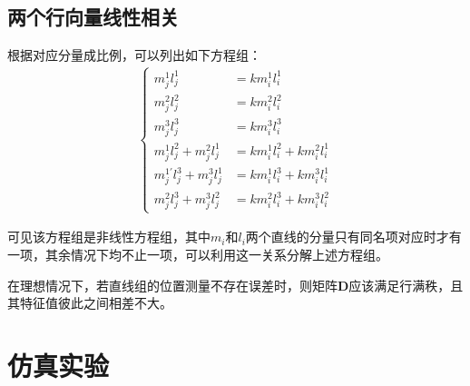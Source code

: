 \documentclass[11pt]{article}
\begin{document}
\subsection{两个行向量线性相关}
根据对应分量成比例，可以列出如下方程组：
\begin{align}
  \left\{
  \begin{aligned}
    m_j^{1}l_j^{1}                 & =km_i^{1}l_i^{1}                 \\
    m_j^{2}l_j^{2}                 & =km_i^{2}l_i^{2}                 \\
    m_j^{3}l_j^{3}                 & =km_i^{3}l_i^{3}                 \\
    m_j^{1}l_j^{2}+m_j^{2}l_j^{1}  & =km_i^{1}l_i^{2}+km_i^{2}l_i^{1} \\
    m_j^{1'}l_j^{3}+m_j^{3}l_j^{1} & =km_i^{1}l_i^{3}+km_i^{3}l_i^{1} \\
    m_j^{2}l_j^{3}+m_j^{3}l_j^{2}  & =km_i^{2}l_i^{3}+km_i^{3}l_i^{2}
  \end{aligned}
  \right.
\end{align}\par
可见该方程组是非线性方程组，其中$m_i$和$l_i$两个直线的分量只有同名项对应时才有一项，其余情况下均不止一项，可以利用这一关系分解上述方程组。


在理想情况下，若直线组的位置测量不存在误差时，则矩阵$\mathbf{D}$应该满足行满秩，且其特征值彼此之间相差不大。
\section{仿真实验}
\newpage
\printbibliography[heading=bibliography,title=参考文献]
\end{document}
